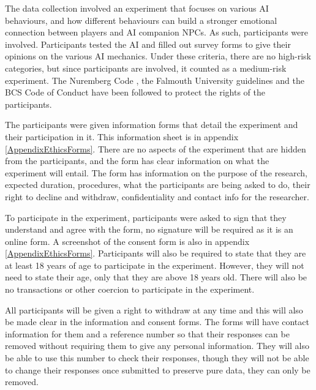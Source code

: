 \documentclass{IEEEtran}
\begin{document}
The data collection involved an experiment that focuses on various AI behaviours, and how different behaviours can build a stronger emotional connection between players and AI companion NPCs. As such, participants were involved. Participants tested the AI and filled out survey forms to give their opinions on the various AI mechanics. Under these criteria, there are no high-risk categories, but since participants are involved, it counted as a medium-risk experiment. The Nuremberg Code \cite{germany1949trials}, the Falmouth University guidelines and the BCS Code of Conduct \cite{BCSConductCode} have been followed to protect the rights of the participants.

The participants were given information forms that detail the experiment and their participation in it. This information sheet is in appendix \ref{AppendixEthicsForms}. There are no aspects of the experiment that are hidden from the participants, and the form has clear information on what the experiment will entail. The form has information on the purpose of the research, expected duration, procedures, what the participants are being asked to do, their right to decline and withdraw, confidentiality and contact info for the researcher.

To participate in the experiment, participants were asked to sign that they understand and agree with the form, no signature will be required as it is an online form. A screenshot of the consent form is also in appendix \ref{AppendixEthicsForms}. Participants will also be required to state that they are at least 18 years of age to participate in the experiment. However, they will not need to state their age, only that they are above 18 years old. There will also be no transactions or other coercion to participate in the experiment.

All participants will be given a right to withdraw at any time and this will also be made clear in the information and consent forms. The forms will have contact information for them and a reference number so that their responses can be removed without requiring them to give any personal information. They will also be able to use this number to check their responses, though they will not be able to change their responses once submitted to preserve pure data, they can only be removed.

\end{document}
